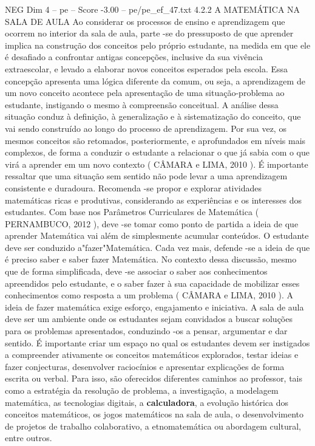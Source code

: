 \begin{textsample}{NEG Dim 4 – pe – Score -3.00 – pe/pe\_ef\_47.txt}  \label{ex:f4_neg_005}
4.2.2 A MATEMÁTICA NA SALA DE AULA Ao considerar os processos de ensino e aprendizagem que ocorrem no interior da sala de aula, parte -se do pressuposto de que aprender implica na construção dos conceitos pelo próprio estudante, na medida em que ele é desafiado a confrontar antigas concepções, inclusive da sua vivência extraescolar, e levado a elaborar novos conceitos esperados pela escola.
Essa concepção apresenta uma lógica diferente da comum, ou seja, a aprendizagem de um novo conceito acontece pela apresentação de uma situação-problema ao estudante, instigando o mesmo à compreensão conceitual.
A análise dessa situação conduz à definição, à generalização e à sistematização do conceito, que vai sendo construído ao longo do processo de aprendizagem.
Por sua vez, os mesmos conceitos são retomados, posteriormente, e aprofundados em níveis mais complexos, de forma a conduzir o estudante a relacionar o que já sabia com o que virá a aprender em um novo contexto ( CÂMARA e LIMA, 2010 ).
É importante ressaltar que uma situação sem sentido não pode levar a uma aprendizagem consistente e duradoura.
Recomenda -se propor e explorar atividades matemáticas ricas e produtivas, considerando as experiências e os interesses dos estudantes.
Com base nos Parâmetros Curriculares de Matemática ( PERNAMBUCO, 2012 ), deve -se tomar como ponto de partida a ideia de que aprender Matemática vai além de simplesmente acumular conteúdos.
O estudante deve ser conduzido a"fazer"Matemática.
Cada vez mais, defende -se a ideia de que é preciso saber e saber fazer Matemática.
No contexto dessa discussão, mesmo que de forma simplificada, deve -se associar o saber aos conhecimentos apreendidos pelo estudante, e o saber fazer à sua capacidade de mobilizar esses conhecimentos como resposta a um problema ( CÂMARA e LIMA, 2010 ).
A ideia de fazer matemática exige esforço, engajamento e iniciativa.
A sala de aula deve ser um ambiente onde os estudantes sejam convidados a buscar soluções para os problemas apresentados, conduzindo -os a pensar, argumentar e dar sentido.
É importante criar um espaço no qual os estudantes devem ser instigados a compreender ativamente os conceitos matemáticos explorados, testar ideias e fazer conjecturas, desenvolver raciocínios e apresentar explicações de forma escrita ou verbal.
Para isso, são oferecidos diferentes caminhos ao professor, tais como a estratégia da resolução de problema, a investigação, a modelagem matemática, as tecnologias digitais, a \textbf{calculadora}, a evolução histórica dos conceitos matemáticos, os jogos matemáticos na sala de aula, o desenvolvimento de projetos de trabalho colaborativo, a etnomatemática ou abordagem cultural, entre outros.

\end{textsample}
